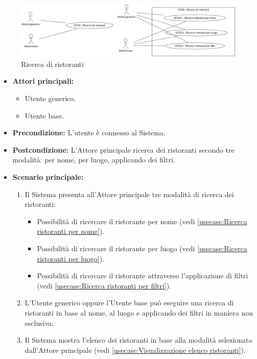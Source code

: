 \newpage
{}
\label{usecase:Ricerca di ristoranti}

\begin{figure}[h]
	\centering
	\includegraphics[width=0.99\textwidth]{./uml/UCG2.png} 
	\caption{Ricerca di ristoranti}
	\label{fig:UCG2}
\end{figure}

\begin{itemize}
	\item \textbf{Attori principali:} 
	\begin{itemize}
		\item Utente generico.
		\item Utente base.
	\end{itemize}

	\item \textbf{Precondizione:}
	      L'utente è connesso al Sistema.

	\item \textbf{Postcondizione:} L'Attore principale ricerca dei ristoranti secondo tre modalità: per nome, per luogo, applicando dei filtri.

	\item \textbf{Scenario principale:}
	      \begin{enumerate}
		      \item Il Sistema presenta all'Attore principale tre modalità di ricerca dei ristoranti:
		            \begin{itemize}
			            \item Possibilità di ricercare il ristorante per nome (vedi \autoref{usecase:Ricerca ristoranti per nome}).
			            \item Possibilità di ricercare il ristorante per luogo (vedi \autoref{usecase:Ricerca ristoranti per luogo}).
			            \item Possibilità di ricercare il ristorante attraverso l'applicazione di filtri (vedi \autoref{usecase:Ricerca ristoranti per filtri}).
		            \end{itemize}
				\item L'Utente generico oppure l'Utente base può eseguire una ricerca di ristoranti in base al nome, al luogo e applicando dei filtri in maniera non esclusiva;

		      \item Il Sistema mostra l'elenco dei ristoranti in base alla modalità selezionata dall'Attore principale (vedi \autoref{usecase:Visualizzazione elenco ristoranti}).

	      \end{enumerate}
\end{itemize}


